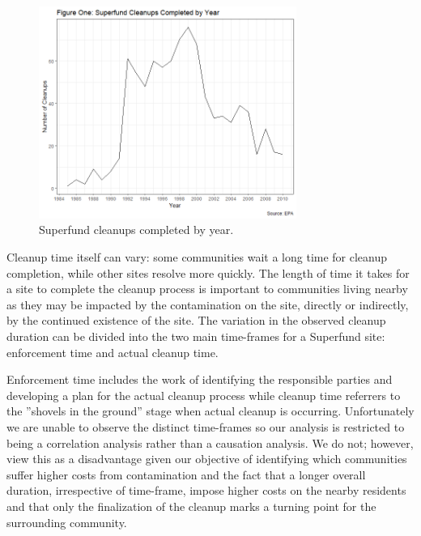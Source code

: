 \documentclass[12pt]{article}
\begin{document}
\begin{figure}[h] \centering
	\includegraphics[width=0.75\textwidth]{fig1.png}
	\caption{Superfund cleanups completed by year.} \label{fig1}
\end{figure}


Cleanup time itself can vary: some communities wait a long time for cleanup completion, while other sites resolve more quickly. The length of time it takes for a site to complete the cleanup process is important to communities living nearby as they may be impacted by the contamination on the site, directly or indirectly, by the continued existence of the site. The variation in the observed cleanup duration can be divided into the two main time-frames for a Superfund site: enforcement time and actual cleanup time.

Enforcement time includes the work of identifying the responsible parties and developing a plan for the actual cleanup process while cleanup time referrers to the ''shovels in the ground'' stage when actual cleanup is occurring. Unfortunately we are unable to observe the distinct time-frames so our analysis is restricted to being a correlation analysis rather than a causation analysis. We do not; however, view this as a disadvantage given our objective of identifying which communities suffer higher costs from contamination and the fact that a longer overall duration, irrespective of time-frame, impose higher costs on the nearby residents and that only the finalization of the cleanup marks a turning point for the surrounding community.
\end{document}

